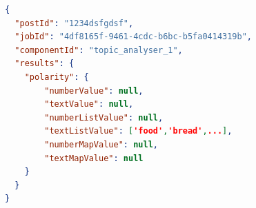 \begin{lstlisting}[language=json,firstnumber=1]
{
  "postId": "1234dsfgdsf",
  "jobId": "4df8165f-9461-4cdc-b6bc-b5fa0414319b",
  "componentId": "topic_analyser_1",
  "results": {
    "polarity": {
        "numberValue": null,
        "textValue": null,
        "numberListValue": null,
        "textListValue": ['food','bread',...],
        "numberMapValue": null,
        "textMapValue": null
    }
  }
}
\end{lstlisting}

